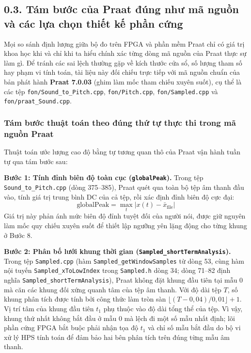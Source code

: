 \subsection*{0.3. Tám bước của Praat đúng như mã nguồn và các lựa chọn thiết kế phần cứng}

Mọi so sánh định lượng giữa bộ đo trên FPGA và phần mềm Praat chỉ có giá trị khoa học khi và chỉ khi ta hiểu chính xác từng dòng mã nguồn của Praat thực sự làm gì. Để tránh các sai lệch thường gặp về kích thước cửa sổ, số lượng tham số hay phạm vi tính toán, tài liệu này đối chiếu trực tiếp với mã nguồn chuẩn của bản phát hành \textbf{Praat 7.0.03} (ghim làm mốc tham chiếu xuyên suốt), cụ thể là các tệp \texttt{fon/Sound\_to\_Pitch.cpp}, \texttt{fon/Pitch.cpp}, \texttt{fon/Sampled.cpp} và \texttt{fon/praat\_Sound.cpp}.

\subsubsection*{Tám bước thuật toán theo đúng thứ tự thực thi trong mã nguồn Praat}
Thuật toán ước lượng cao độ bằng tự tương quan thô của Praat vận hành tuần tự qua tám bước sau:

\textbf{Bước 1: Tính đỉnh biên độ toàn cục (\texttt{globalPeak}).}
Trong tệp \texttt{Sound\_to\_Pitch.cpp} (dòng 375--385), Praat quét qua toàn bộ tệp âm thanh đầu vào, tính giá trị trung bình DC của cả tệp, rồi xác định đỉnh biên độ cực đại:
\begin{equation}
\text{globalPeak} = \max_{t} |x(t) - \bar{x}_{\text{file}}|
\end{equation}
Giá trị này phản ánh mức biên độ đỉnh tuyệt đối của người nói, được giữ nguyên làm mốc quy chiếu xuyên suốt để thiết lập ngưỡng yên lặng động cho từng khung ở Bước 8.

\textbf{Bước 2: Phân bố lưới khung thời gian (\texttt{Sampled\_shortTermAnalysis}).}
Trong tệp \texttt{Sampled.cpp} (hàm \texttt{Sampled\_getWindowSamples} từ dòng 53, cùng hàm nội tuyến \texttt{Sampled\_xToLowIndex} trong \texttt{Sampled.h} dòng 34; dòng 71--82 định nghĩa \texttt{Sampled\_shortTermAnalysis}), Praat không đặt khung đầu tiên tại mẫu 0 mà căn các khung đối xứng quanh tâm của tệp âm thanh. Với độ dài tệp $T$, số khung phân tích được tính bởi công thức làm tròn sàn $\lfloor(T - 0{,}04)/0{,}01\rfloor + 1$. Vị trí tâm của khung đầu tiên $t_1$ phụ thuộc vào độ dài tổng thể của tệp. Vì vậy, khung thứ nhất không bắt đầu ở mẫu 0 mà lệch đi một số mẫu nhất định; lõi phần cứng FPGA bắt buộc phải nhận tọa độ $t_1$ và chỉ số mẫu bắt đầu do bộ vi xử lý HPS tính toán để đảm bảo hai bên phân tích trên đúng từng mẫu âm thanh.


